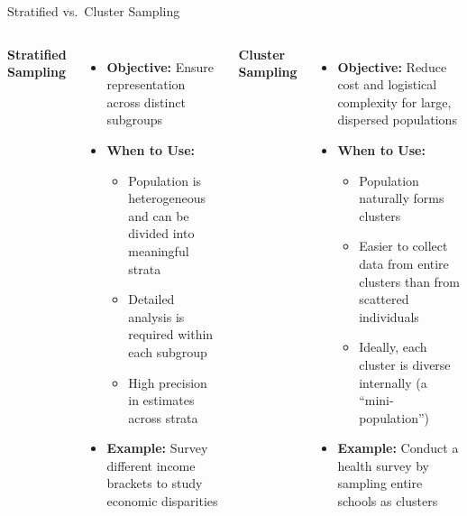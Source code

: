 \documentclass[handout]{beamer} %
\begin{document}
\begin{frame}{Stratified vs.\ Cluster Sampling}

{ \small
\begin{columns}[T]
    \textbf{Stratified Sampling}
    \begin{itemize}
        \item \textbf{Objective:} Ensure representation across distinct subgroups
        \item \textbf{When to Use:}
        \begin{itemize}
            \item Population is heterogeneous and can be divided into meaningful strata
            \item Detailed analysis is required within each subgroup
            \item High precision in estimates across strata
        \end{itemize} \pause %
        \item \textbf{Example:} Survey different income brackets to study economic disparities  \pause %
    \end{itemize}
    
    \textbf{Cluster Sampling}
    \begin{itemize}
        \item \textbf{Objective:} Reduce cost and logistical complexity for large, dispersed populations
        \item \textbf{When to Use:}
        \begin{itemize}
            \item Population naturally forms clusters
            \item Easier to collect data from entire clusters than from scattered individuals
            \item Ideally, each cluster is diverse internally (a “mini-population”)
        \end{itemize} \pause %
        \item \textbf{Example:} Conduct a health survey by sampling entire schools as clusters
    \end{itemize}
\end{columns}
}
\end{frame}
\end{document}

